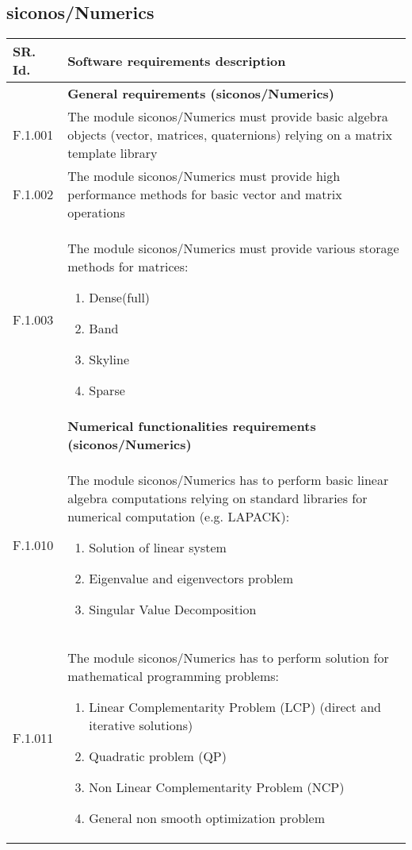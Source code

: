 \subsection{\ac{siconos}/Numerics}
\begin{longtable}{%
    |>{\columncolor[gray]{.8}}p{}%
    |>{\columncolor[gray]{.95}}p{}|}
  \hline
  \rowcolor[gray]{.8}   SR. Id. & Software requirements description \\
  \hline 
  \hline
  & \textbf{General  requirements (\ac{siconos}/Numerics)}\\
  \hline 
  F.1.001 & The module \ac{siconos}/Numerics must provide basic algebra objects (vector, matrices, quaternions) relying on a matrix template library \\
  F.1.002 & The module \ac{siconos}/Numerics must provide  high performance methods for  basic vector and matrix operations\\
  F.1.003 & The module \ac{siconos}/Numerics must provide various storage methods for matrices:
  \begin{enumerate}
  \item Dense(full)
  \item Band
  \item Skyline
  \item Sparse
  \end{enumerate}\\
 \hline 
 & \textbf{ Numerical functionalities  requirements (\ac{siconos}/Numerics)}\\
  \hline
  F.1.010 & The module  \ac{siconos}/Numerics has to perform basic linear algebra computations  relying on standard libraries for numerical computation (e.g. LAPACK):
  \begin{enumerate}
  \item Solution of linear system 
  \item Eigenvalue and eigenvectors problem
  \item Singular Value Decomposition
  \end{enumerate}
  \\
  F.1.011 & The module \ac{siconos}/Numerics has to perform solution for mathematical programming problems:
  \begin{enumerate}
  \item Linear Complementarity Problem (LCP) (direct and iterative solutions) 
  \item Quadratic problem (QP) 
  \item Non Linear  Complementarity Problem (NCP) 
  \item General non smooth optimization problem

\end{enumerate}
\end{longtable}
